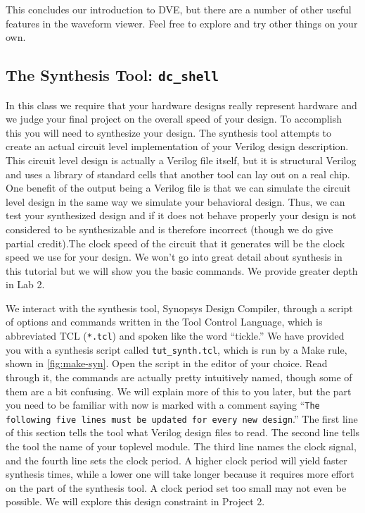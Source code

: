 \documentclass[dvipsnames]{article}
\begin{document}
This concludes our introduction to DVE, but there are a number of other useful 
features in the waveform viewer. Feel free to explore and try other things on 
your own.

\subsection{The Synthesis Tool: \texttt{dc\_shell}}
In this class we require that your hardware designs really represent hardware
and we judge your final project on the overall speed of your design. To 
 accomplish this you will need to synthesize your design. The synthesis tool
attempts to create an actual circuit level implementation of your Verilog design
description. This circuit level design is actually a Verilog file itself, but it
is structural Verilog and uses a library of standard cells that another tool can
lay out on a real chip. One benefit of the output being a Verilog file is that 
we can simulate the circuit level design in the same way we simulate your 
behavioral design. Thus, we can test your synthesized design and if it does not
behave properly your design is not considered to be synthesizable and is 
therefore incorrect (though we do give partial credit).The clock speed of the 
circuit that it generates will be the clock speed we use for your design. We 
won’t go into great detail about synthesis in this tutorial but we will show you
the basic commands. We provide greater depth in Lab 2.

We interact with the synthesis tool, Synopsys Design Compiler, through a script
of options and commands written in the Tool Control Language, which is
abbreviated TCL (\texttt{*.tcl}) and spoken like the word ``tickle.'' We have
provided you with a synthesis script called \texttt{tut\_synth.tcl}, which is
run by a Make rule, shown in \cref{fig:make-syn}. Open the script in the editor
of your choice. Read through it, the commands are actually pretty intuitively
named, though some of them are a bit confusing. We will explain more of this to
you later, but the part you need to be familiar with now is marked with a
comment saying ``\texttt{The following five lines must be updated for every new
design}.'' The first line of this section tells the tool what Verilog design
files to read. The second line tells the tool the name of your toplevel module.
The third line names the clock signal, and the fourth line sets the clock period. A higher clock period will yield faster synthesis times, while a lower
one will take longer because it requires more effort on the part of the
synthesis tool. A clock period set too small may not even be possible. We will
explore this design constraint in Project 2.
\end{document}
